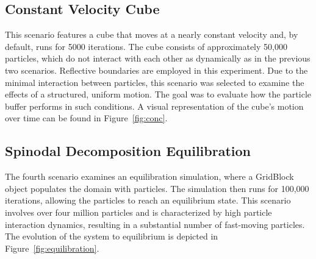 \subsection{Constant Velocity Cube} This scenario features a cube that moves at a nearly constant velocity and, by default, runs for 5000 iterations. The cube consists of approximately 50,000 particles, which do not interact with each other as dynamically as in the previous two scenarios. Reflective boundaries are employed in this experiment. Due to the minimal interaction between particles, this scenario was selected to examine the effects of a structured, uniform motion. The goal was to evaluate how the particle buffer performs in such conditions. A visual representation of the cube's motion over time can be found in Figure~\ref{fig:conc}.

\subsection{Spinodal Decomposition Equilibration}

The fourth scenario examines an equilibration simulation, where a GridBlock object populates the domain with particles. The simulation then runs for 100,000 iterations, allowing the particles to reach an equilibrium state. This scenario involves over four million particles and is characterized by high particle interaction dynamics, resulting in a substantial number of fast-moving particles. The evolution of the system to equilibrium is depicted in Figure~\ref{fig:equilibration}.



